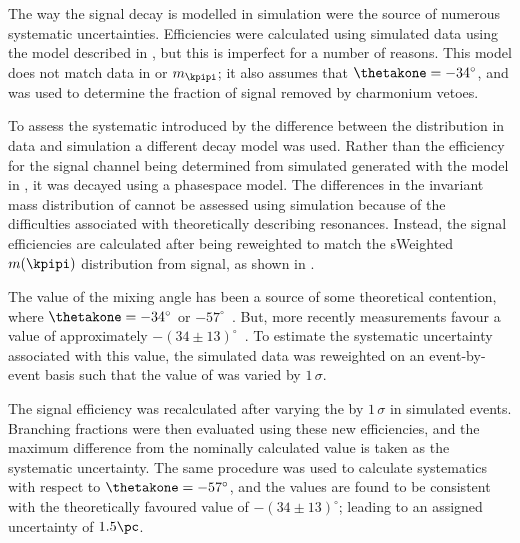 The way the signal decay is modelled in simulation were the source of numerous systematic
uncertainties.
Efficiencies were calculated using simulated data using the model described in
, but this is imperfect for a number of reasons.
This model does not match data in \qsq or $m_\kpipi$; it also assumes that $\thetakone=-34^\circ$,
and was used to determine the fraction of signal removed by charmonium vetoes.

To assess the systematic introduced by the difference between the \qsq distribution in data and
simulation a different decay model was used.
Rather than the efficiency for the signal channel being determined from simulated
 generated with the model in , it was decayed
using a phasespace model.
The differences in the invariant mass distribution of \kpipi cannot be assessed using simulation
because of the difficulties associated with theoretically describing \kpipi resonances.
Instead, the signal efficiencies are calculated after being reweighted to match the sWeighted
$m(\kpipi)$ distribution from signal, as shown in .

The value of the mixing angle \thetakone has been a source of some theoretical contention, where
$\thetakone=-34^\circ$ or
$-57^\circ$~\cite{PhysRevD.47.1252,Tayduganov:2011ui,Hatanaka:2008xj,Cheng:2011pb,Divotgey:2013jba,Cheng:2013cwa}.
But, more recently measurements favour a value of approximately
$-(34\pm13)^\circ$~\cite{Hatanaka:2008xj,Cheng:2011pb,Divotgey:2013jba,Cheng:2013cwa}.
To estimate the systematic uncertainty associated with this value, the simulated data was
reweighted on an event-by-event basis such that the value of \thetakone was varied by $1\,\sigma$.


The signal efficiency was recalculated after varying the \thetakone by $1\,\sigma$ in simulated
 events.
Branching fractions were then evaluated using these new efficiencies, and the maximum difference
from the nominally calculated value is taken as the systematic uncertainty.
The same procedure was used to calculate systematics with respect to $\thetakone=-57^\circ$, and
the values are found to be consistent with the theoretically favoured value of $-(34\pm13)^\circ$;
leading to an assigned uncertainty of \approx$1.5\pc$.


